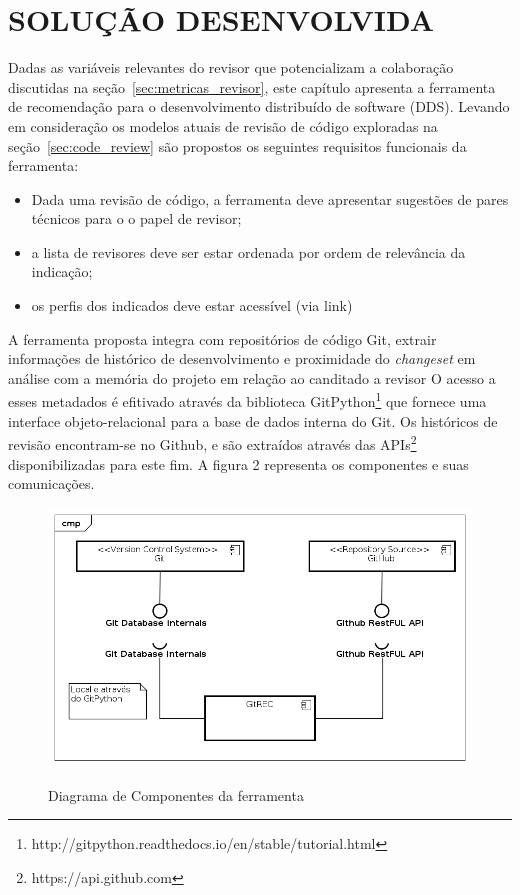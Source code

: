 \documentclass[preprint,12pt]{elsarticle}
\begin{document}
\chapter{SOLUÇÃO DESENVOLVIDA}\label{chap:solucao}
    Dadas as variáveis relevantes do revisor que potencializam a colaboração discutidas na seção~\ref{sec:metricas_revisor}, este capítulo apresenta a ferramenta de recomendação para o desenvolvimento distribuído de software (DDS). Levando em consideração os modelos atuais de revisão de código exploradas na seção~\ref{sec:code_review} são propostos os seguintes requisitos funcionais da ferramenta:
		\begin{itemize}
			\item Dada uma revisão de código, a ferramenta deve apresentar sugestões de pares técnicos para o o papel de revisor;
			\item a lista de revisores deve ser estar ordenada por ordem de relevância da indicação;
			\item os perfis dos indicados deve estar acessível (via link)
		\end{itemize}

		A ferramenta proposta integra com repositórios de código Git, extrair informações de histórico de desenvolvimento e proximidade do \textit{changeset} em análise com a memória do projeto em relação ao canditado a revisor O acesso a esses metadados é efitivado através da biblioteca GitPython\footnote{http://gitpython.readthedocs.io/en/stable/tutorial.html} que fornece uma interface objeto-relacional para a base de dados interna do Git. Os históricos de revisão encontram-se no Github, e são extraídos através das APIs\footnote{https://api.github.com} disponibilizadas para este fim. A figura 2 representa os componentes e suas comunicações.

		\begin{figure}[!htbp]
		 \includegraphics[width=\textwidth]{diagrama_componentes}\label{fig:diagrama_componentes}
		 \caption{Diagrama de Componentes da ferramenta}
	 \end{figure}
\end{document}
